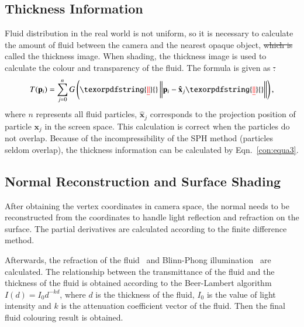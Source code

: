 \documentclass[times,twocolumn,final]{elsarticle}
\providecommand{\DIFaddtex}[1]{{\protect\color{blue}\uwave{#1}}} %
\providecommand{\DIFdeltex}[1]{{\protect\color{red}\sout{#1}}}                      %
\providecommand{\DIFaddbegin}{} %
\providecommand{\DIFaddend}{} %
\providecommand{\DIFdelbegin}{} %
\providecommand{\DIFdelend}{} %
\providecommand{\DIFadd}[1]{\texorpdfstring{\DIFaddtex{#1}}{#1}} %
\providecommand{\DIFdel}[1]{\texorpdfstring{\DIFdeltex{#1}}{}} %
\begin{document}
\DIFdelend \subsection{Thickness Information}
Fluid distribution in the real world is not uniform, so it is necessary to calculate the amount of fluid between the camera and the nearest opaque object, \DIFdelbegin \DIFdel{which is }\DIFdelend called the thickness image. When shading, the thickness image is used to calculate the colour and transparency of the fluid\cite{ref:ref14}. The formula is given as \DIFdelbegin \DIFdel{:
}\DIFdelend \DIFaddbegin \DIFadd{follows:
}\DIFaddend \begin{equation}
    T(\mathbf{{p}}_i)=\sum_{j=0}^{n} G\left( \DIFdelbegin \DIFdel{\| }\DIFdelend \DIFaddbegin \left\| \DIFaddend \mathbf{{p}}_i - \mathbf{\hat{x}}_j \DIFdelbegin \DIFdel{\| }\DIFdelend \DIFaddbegin \right\| \DIFaddend \right), 
\label{con:equa3}
\end{equation}
where $n$ represents all fluid particles, $\mathbf{\hat{x}}_j$ corresponds to the projection position of particle $\mathbf{{x}}_j$ in the screen space. This calculation is correct when the particles do not overlap. Because of the incompressibility of the SPH method (particles seldom overlap), the thickness information can be calculated by Eqn.~\ref{con:equa3}.

\subsection{Normal Reconstruction and Surface Shading}
After obtaining the vertex coordinates in camera space, the normal needs to be reconstructed from the coordinates to handle light reflection and refraction on the surface. The partial derivatives are calculated according to the finite difference method.

Afterwards, the refraction of the fluid~\cite{ref:ref25} and Blinn-Phong illumination~\cite{ref:ref27} are calculated. The relationship between the transmittance of the fluid and the thickness of the fluid is obtained according to the Beer-Lambert algorithm\cite{ref:ref28} $I(d)=I_{0} d^{-k d}$, where $d$ is the thickness of the fluid, $I_0$ is the value of light intensity and $k$ is the attenuation coefficient vector of the fluid. Then the final fluid colouring result is obtained.
\end{document}
